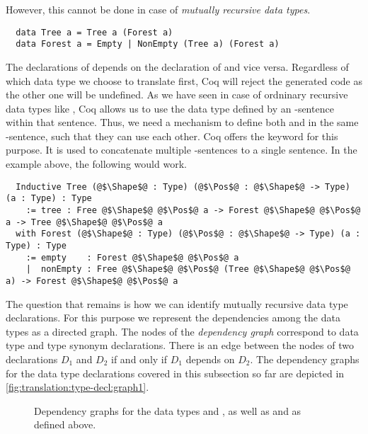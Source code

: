 However, this cannot be done in case of \textit{mutually recursive data types}.
\begin{verbatim}
  data Tree a = Tree a (Forest a)
  data Forest a = Empty | NonEmpty (Tree a) (Forest a)
\end{verbatim}
The declarations of  depends on the declaration of  and vice versa.
Regardless of which data type we choose to translate first, Coq will reject the generated code as the other one will be undefined.
As we have seen in case of ordninary recursive data types like , Coq allows us to use the data type defined by an -sentence within that sentence.
Thus, we need a mechanism to define both  and  in the same -sentence, such that they can use each other.
Coq offers the  keyword for this purpose.
It is used to concatenate multiple -sentences to a single sentence.
In the example above, the following would work.
\begin{verbatim}
  Inductive Tree (@$\Shape$@ : Type) (@$\Pos$@ : @$\Shape$@ -> Type) (a : Type) : Type
    := tree : Free @$\Shape$@ @$\Pos$@ a -> Forest @$\Shape$@ @$\Pos$@ a -> Tree @$\Shape$@ @$\Pos$@ a
  with Forest (@$\Shape$@ : Type) (@$\Pos$@ : @$\Shape$@ -> Type) (a : Type) : Type
    := empty    : Forest @$\Shape$@ @$\Pos$@ a
    |  nonEmpty : Free @$\Shape$@ @$\Pos$@ (Tree @$\Shape$@ @$\Pos$@ a) -> Forest @$\Shape$@ @$\Pos$@ a
\end{verbatim}

The question that remains is how we can identify mutually recursive data type declarations.
For this purpose we represent the dependencies among the data types as a directed graph.
The nodes of the \textit{dependency graph} correspond to data type and type synonym declarations.
There is an edge between the nodes of two declarations $D_1$ and $D_2$ if and only if $D_1$ depends on $D_2$.
The dependency graphs for the data type declarations covered in this subsection so far are depicted in \autoref{fig:translation:type-decl:graph1}.

\begin{figure}[H]
  \caption{Dependency graphs for the data types  and ,  as well as  and  as defined above.}
  \label{fig:translation:type-decl:graph1}
\end{figure}

